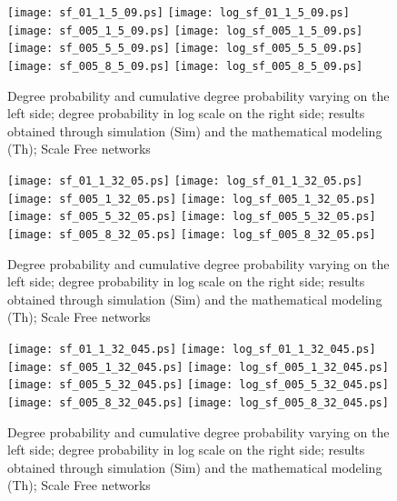 \documentclass[a4paper,twosided]{article}
\begin{document}
\begin{figure}
   \centering
   \texttt{[image: sf\_01\_1\_5\_09.ps]}
   \texttt{[image: log\_sf\_01\_1\_5\_09.ps]}
   \texttt{[image: sf\_005\_1\_5\_09.ps]}
   \texttt{[image: log\_sf\_005\_1\_5\_09.ps]}
   \texttt{[image: sf\_005\_5\_5\_09.ps]}
   \texttt{[image: log\_sf\_005\_5\_5\_09.ps]}
   \texttt{[image: sf\_005\_8\_5\_09.ps]}
   \texttt{[image: log\_sf\_005\_8\_5\_09.ps]}
   \caption{Degree probability and cumulative degree probability varying  on the left side; degree probability in log scale on the right side; results obtained through simulation (Sim) and the mathematical modeling (Th); Scale Free networks }
   \label{fig:fig_sf12}
\end{figure}

\begin{figure}
   \centering
   \texttt{[image: sf\_01\_1\_32\_05.ps]}
   \texttt{[image: log\_sf\_01\_1\_32\_05.ps]}
   \texttt{[image: sf\_005\_1\_32\_05.ps]}
   \texttt{[image: log\_sf\_005\_1\_32\_05.ps]}
   \texttt{[image: sf\_005\_5\_32\_05.ps]}
   \texttt{[image: log\_sf\_005\_5\_32\_05.ps]}
   \texttt{[image: sf\_005\_8\_32\_05.ps]}
   \texttt{[image: log\_sf\_005\_8\_32\_05.ps]}
   \caption{Degree probability and cumulative degree probability varying  on the left side; degree probability in log scale on the right side; results obtained through simulation (Sim) and the mathematical modeling (Th); Scale Free networks }
   \label{fig:fig_sf13}
\end{figure}

\begin{figure}
   \centering
   \texttt{[image: sf\_01\_1\_32\_045.ps]}
   \texttt{[image: log\_sf\_01\_1\_32\_045.ps]}
   \texttt{[image: sf\_005\_1\_32\_045.ps]}
   \texttt{[image: log\_sf\_005\_1\_32\_045.ps]}
   \texttt{[image: sf\_005\_5\_32\_045.ps]}
   \texttt{[image: log\_sf\_005\_5\_32\_045.ps]}
   \texttt{[image: sf\_005\_8\_32\_045.ps]}
   \texttt{[image: log\_sf\_005\_8\_32\_045.ps]}
   \caption{Degree probability and cumulative degree probability varying  on the left side; degree probability in log scale on the right side; results obtained through simulation (Sim) and the mathematical modeling (Th); Scale Free networks }
   \label{fig:fig_sf14}
\end{figure}
\end{document}
